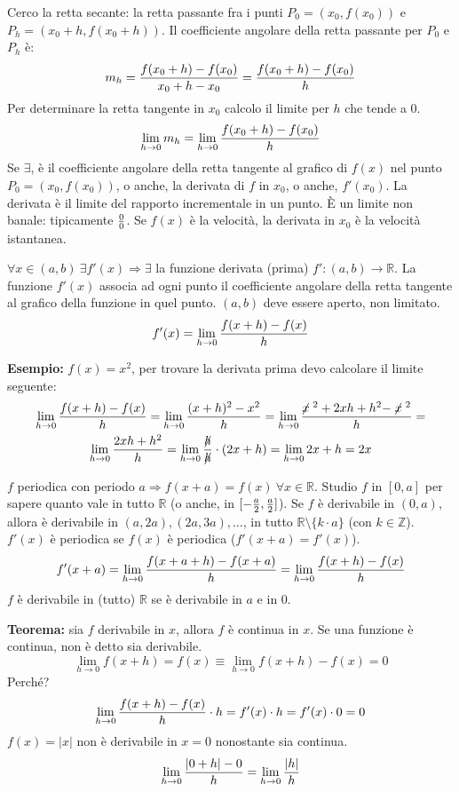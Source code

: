 \documentclass[12pt,a4paper]{article}
\begin{document}
Cerco la retta secante: la retta passante fra i punti $ P_0 = 
(x_0,f(x_0)) $ e $ P_h = (x_0 + h, f(x_0 + h)) $. Il coefficiente
angolare della retta passante per $P_0$ e $P_h$ \`e:
$$ m_h = { f(x_0+h) - f(x_0) \over x_0 + h - x_0 } =
{ f(x_0+h) - f(x_0) \over h } $$
Per determinare la retta tangente in $x_0$ calcolo il limite
per $h$ che tende a $0$.
$$ \lim_{h \to 0} m_h = \lim_{h \to 0} { f(x_0+h) - f(x_0) \over h } $$
Se $\exists$, \`e il coefficiente angolare della retta tangente
al grafico di $f(x)$ nel punto $ P_0 = (x_0,f(x_0))$, o anche,
la derivata di $f$ in $x_0$, o anche, $f'(x_0)$. La derivata \`e
il limite del rapporto incrementale in un punto. \`E un limite
non banale: tipicamente ${0 \over 0}$. Se $f(x)$ \`e la velocit\`a,
la derivata in $x_0$ \`e la velocit\`a istantanea.

$ \forall x \in (a,b) \ \exists f'(x) \Rightarrow \exists$ la funzione
derivata (prima) $f': (a,b) \to \mathbb{R}$. La funzione $f'(x)$ associa
ad ogni punto il coefficiente angolare della retta tangente al grafico
della funzione in quel punto. $(a,b)$ deve essere aperto, non limitato.
$$ f'(x) = \lim_{h \to 0} { f(x+h) - f(x) \over h } $$

\textbf{Esempio:} $f(x) = x^2$, per trovare la derivata prima
devo calcolare il limite seguente:
\begin{multline}
\lim_{h \to 0} {f(x+h) - f(x) \over h} = \lim_{h \to 0} 
{(x+h)^2 - x^2 \over h} = \lim_{h \to 0} {\centernot x^2 + 2xh +
h^2 - \centernot x^2 \over h} = \\ \lim_{h \to 0} {2xh + h^2 \over h} =
\lim_{h \to 0} {\centernot h \over \centernot h} \cdot (2x+h) =
\lim_{h \to 0} 2x+h = 2x
\end{multline}

$f$ periodica con periodo $a \Rightarrow f(x+a)=f(x) \ \forall x \in
\mathbb{R}$. Studio $f$ in $[0,a]$ per sapere quanto vale in tutto
$\mathbb{R}$ (o anche, in $ [-{a \over 2}, {a \over 2}] $). Se $f$
\`e derivabile in $(0,a)$, allora \`e derivabile in $(a,2a),(2a,3a),\dots$,
in tutto $\mathbb{R} \setminus \{k \cdot a\}$ (con $k \in \mathbb{Z}$).
$f'(x)$ \`e periodica se $f(x)$ \`e periodica ($f'(x+a) = f'(x)$).
$$ f'(x+a) = \lim_{h \to 0} {f(x+a+h) - f(x+a) \over h} =
\lim_{h \to 0} {f(x+h) - f(x) \over h} $$
$f$ \`e derivabile in (tutto) $\mathbb{R}$ se \`e derivabile in $a$
e in $0$.

\textbf{Teorema:} sia $f$ derivabile in $x$, allora $f$ \`e continua in
$x$. Se una funzione \`e continua, non \`e detto sia derivabile.
$$ \lim \limits_{h \to 0} f(x + h) = f(x) 
\equiv \lim \limits_{h \to 0} f(x+h) - f(x) = 0 $$
Perch\'e?
$$ \lim \limits_{h \to 0} { f(x+h) - f(x) \over h } \cdot h 
= f'(x) \cdot h = f' (x) \cdot 0 = 0 $$
$f(x) = |x|$ non \`e derivabile in $x = 0$ nonostante sia continua.
$$ \lim \limits_{h \to 0} { |0 + h| - 0 \over h} =
\lim \limits_{h \to 0} {|h| \over h} $$
\end{document}
